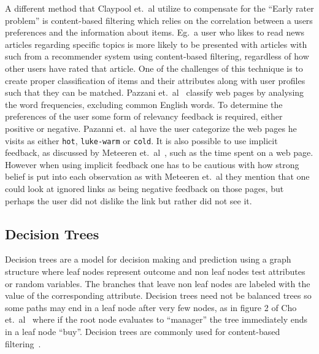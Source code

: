 A different method that Claypool et.~al utilize to compensate for the ``Early rater problem'' is content-based filtering which relies on the correlation between a users preferences and the information about items.
Eg.~a user who likes to read news articles regarding specific topics is more likely to be presented with articles with such from a recommender system using content-based filtering, regardless of how other users have rated that article.
One of the challenges of this technique is to create proper classification of items and their attributes along with user profiles such that they can be matched.
Pazzani et.~al~\cite{pazzani1996syskill} classify web pages by analysing the word frequencies, excluding common English words.
To determine the preferences of the user some form of relevancy feedback is required, either positive or negative.
Pazanni et.~al have the user categorize the web pages he visits as either \texttt{hot}, \texttt{luke-warm} or \texttt{cold}.
It is also possible to use implicit feedback, as discussed by Meteeren et.~al~\cite{van2000using}, such as the time spent on a web page.
However when using implicit feedback one has to be cautious with how strong belief is put into each observation as with Meteeren et.~al they mention that one could look at ignored links as being negative feedback on those pages, but perhaps the user did not dislike the link but rather did not see it.



\subsection{Decision Trees}
\label{sec:analysis:recommender-methods:decision-trees}

Decision trees are a model for decision making and prediction using a graph structure where leaf nodes represent outcome and non leaf nodes test attributes or random variables.
The branches that leave non leaf nodes are labeled with the value of the corresponding attribute.
Decision trees need not be balanced trees so some paths may end in a leaf node after very few nodes, as in figure 2 of Cho et.~al~\cite{cho2002personalized} where if the root node evaluates to ``manager'' the tree immediately ends in a leaf node ``buy''.
Decision trees are commonly used for content-based filtering~\cite{adomavicius2005toward}.

